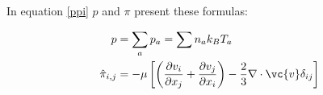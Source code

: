 In equation \eqref{ppi} $p$ and $\pi$ present these formulas:

\begin{align*}
	p& = \sum_a p_a = \sum n_a k_B T_a \\
	\hat{\pi}_{i,j}& = -\mu \left[\left(\frac{\partial v_i}{\partial x_j} + \frac{\partial v_j}{\partial x_i}\right) - \frac{2}{3} \nabla \cdot \vc{v} \delta_{i j}\right]
	\label{navier}
\end{align*}